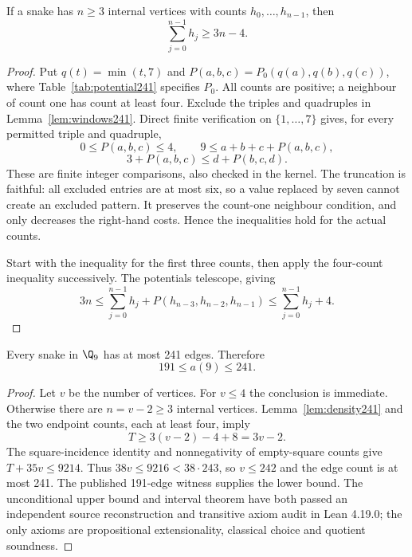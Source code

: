 \begin{lemma}\label{lem:density241}
If a snake has $n\ge3$ internal vertices with counts $h_0,\ldots,h_{n-1}$,
then
\[
\sum_{j=0}^{n-1}h_j\ge3n-4.
\]
\end{lemma}
\begin{proof}
Put $q(t)=\min(t,7)$ and $P(a,b,c)=P_0(q(a),q(b),q(c))$, where
Table~\ref{tab:potential241} specifies $P_0$. All counts are positive;
a neighbour of count one has count at least four. Exclude the triples and
quadruples in Lemma~\ref{lem:windows241}. Direct finite verification on
$\{1,\ldots,7\}$ gives, for every permitted triple and quadruple,
\[
0\le P(a,b,c)\le4,\qquad
9\le a+b+c+P(a,b,c),
\]
\[
3+P(a,b,c)\le d+P(b,c,d).
\]
These are finite integer comparisons, also checked in the kernel.
The truncation is faithful: all excluded entries are at most six,
so a value replaced by seven cannot create an excluded pattern. It
preserves the count-one neighbour condition, and only decreases the
right-hand costs. Hence the inequalities hold for the actual counts.

Start with the inequality for the first three counts, then apply the
four-count inequality successively. The potentials telescope, giving
\[
3n\le \sum_{j=0}^{n-1}h_j+P(h_{n-3},h_{n-2},h_{n-1})
\le\sum_{j=0}^{n-1}h_j+4.
\]
\end{proof}



\begin{theorem}\label{thm:upper241}
Every snake in $\Q_9$ has at most 241 edges. Therefore
\[
\boxed{191\le a(9)\le241.}
\]
\end{theorem}
\begin{proof}
Let $v$ be the number of vertices. For $v\le4$ the conclusion is immediate.
Otherwise there are $n=v-2\ge3$ internal vertices. Lemma~\ref{lem:density241}
and the two endpoint counts, each at least four, imply
\[
T\ge3(v-2)-4+8=3v-2.
\]
The square-incidence identity and nonnegativity of empty-square counts give
$T+35v\le9214$. Thus $38v\le9216<38\cdot243$, so $v\le242$ and the
edge count is at most 241. The published 191-edge witness supplies the
lower bound. The unconditional upper bound and interval theorem have
both passed an independent source reconstruction and transitive axiom
audit in Lean 4.19.0; the only axioms are propositional extensionality,
classical choice and quotient soundness.
\end{proof}
